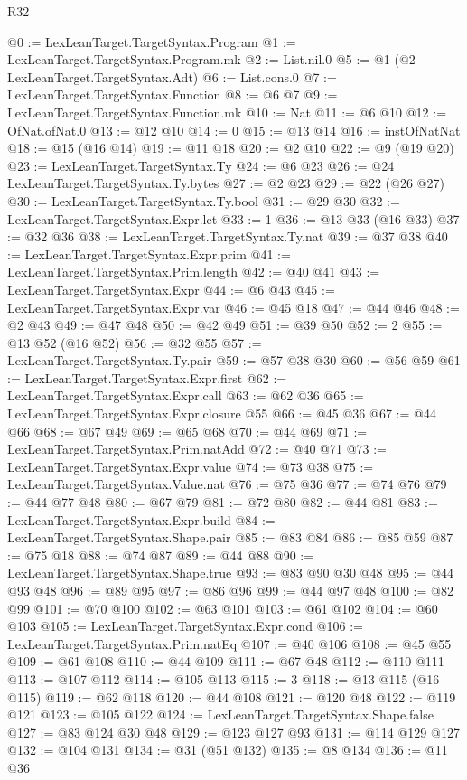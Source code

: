 \begin{lexlean}{R32}
\begin{coremodule}
@0 := LexLeanTarget.TargetSyntax.Program
@1 := LexLeanTarget.TargetSyntax.Program.mk
@2 := List.nil.{0}
@5 := @1 (@2 LexLeanTarget.TargetSyntax.Adt)
@6 := List.cons.{0}
@7 := LexLeanTarget.TargetSyntax.Function
@8 := @6 @7
@9 := LexLeanTarget.TargetSyntax.Function.mk
@10 := Nat
@11 := @6 @10
@12 := OfNat.ofNat.{0}
@13 := @12 @10
@14 := 0
@15 := @13 @14
@16 := instOfNatNat
@18 := @15 (@16 @14)
@19 := @11 @18
@20 := @2 @10
@22 := @9 (@19 @20)
@23 := LexLeanTarget.TargetSyntax.Ty
@24 := @6 @23
@26 := @24 LexLeanTarget.TargetSyntax.Ty.bytes
@27 := @2 @23
@29 := @22 (@26 @27)
@30 := LexLeanTarget.TargetSyntax.Ty.bool
@31 := @29 @30
@32 := LexLeanTarget.TargetSyntax.Expr.let
@33 := 1
@36 := @13 @33 (@16 @33)
@37 := @32 @36
@38 := LexLeanTarget.TargetSyntax.Ty.nat
@39 := @37 @38
@40 := LexLeanTarget.TargetSyntax.Expr.prim
@41 := LexLeanTarget.TargetSyntax.Prim.length
@42 := @40 @41
@43 := LexLeanTarget.TargetSyntax.Expr
@44 := @6 @43
@45 := LexLeanTarget.TargetSyntax.Expr.var
@46 := @45 @18
@47 := @44 @46
@48 := @2 @43
@49 := @47 @48
@50 := @42 @49
@51 := @39 @50
@52 := 2
@55 := @13 @52 (@16 @52)
@56 := @32 @55
@57 := LexLeanTarget.TargetSyntax.Ty.pair
@59 := @57 @38 @30
@60 := @56 @59
@61 := LexLeanTarget.TargetSyntax.Expr.first
@62 := LexLeanTarget.TargetSyntax.Expr.call
@63 := @62 @36
@65 := LexLeanTarget.TargetSyntax.Expr.closure @55
@66 := @45 @36
@67 := @44 @66
@68 := @67 @49
@69 := @65 @68
@70 := @44 @69
@71 := LexLeanTarget.TargetSyntax.Prim.natAdd
@72 := @40 @71
@73 := LexLeanTarget.TargetSyntax.Expr.value
@74 := @73 @38
@75 := LexLeanTarget.TargetSyntax.Value.nat
@76 := @75 @36
@77 := @74 @76
@79 := @44 @77 @48
@80 := @67 @79
@81 := @72 @80
@82 := @44 @81
@83 := LexLeanTarget.TargetSyntax.Expr.build
@84 := LexLeanTarget.TargetSyntax.Shape.pair
@85 := @83 @84
@86 := @85 @59
@87 := @75 @18
@88 := @74 @87
@89 := @44 @88
@90 := LexLeanTarget.TargetSyntax.Shape.true
@93 := @83 @90 @30 @48
@95 := @44 @93 @48
@96 := @89 @95
@97 := @86 @96
@99 := @44 @97 @48
@100 := @82 @99
@101 := @70 @100
@102 := @63 @101
@103 := @61 @102
@104 := @60 @103
@105 := LexLeanTarget.TargetSyntax.Expr.cond
@106 := LexLeanTarget.TargetSyntax.Prim.natEq
@107 := @40 @106
@108 := @45 @55
@109 := @61 @108
@110 := @44 @109
@111 := @67 @48
@112 := @110 @111
@113 := @107 @112
@114 := @105 @113
@115 := 3
@118 := @13 @115 (@16 @115)
@119 := @62 @118
@120 := @44 @108
@121 := @120 @48
@122 := @119 @121
@123 := @105 @122
@124 := LexLeanTarget.TargetSyntax.Shape.false
@127 := @83 @124 @30 @48
@129 := @123 @127 @93
@131 := @114 @129 @127
@132 := @104 @131
@134 := @31 (@51 @132)
@135 := @8 @134
@136 := @11 @36

\end{coremodule}
\end{lexlean}
